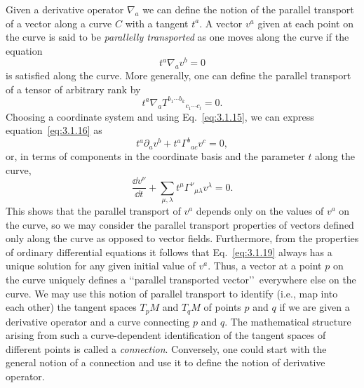 Given a derivative operator $\nabla_a$ we can define the notion of the parallel transport
of a vector along a curve $C$ with a tangent $t^a$. A vector $v^a$ given at each point on the
curve is said to be \emph{parallelly transported} as one moves along the curve if the equation
\begin{equation}
  t^a\nabla_av^b=0
  \tag{3.1.16}\label{eq:3.1.16}
\end{equation}
is satisfied along the curve. More generally, one can define the parallel transport of
a tensor of arbitrary rank by
\begin{equation}
  t^a\nabla_aT^{b_1\cdots b_k}{}_{c_1\cdots c_l}=0.
  \tag{3.1.17}\label{eq:3.1.17}
\end{equation}
Choosing a coordinate system and using Eq.~\eqref{eq:3.1.15}, we can express equation~\eqref{eq:3.1.16} as
\begin{equation}
  t^a\partial_av^b+t^a\Gamma^b{}_{ac}v^c=0,
  \tag{3.1.18}\label{eq:3.1.18}
\end{equation}
or, in terms of components in the coordinate basis and the parameter $t$ along the
curve,
\begin{equation}
  \frac{\dd v^\nu}{\dd t}+\sum_{\mu,\lambda}t^\mu\Gamma^\nu{}_{\mu\lambda}v^\lambda=0.
  \tag{3.1.19}\label{eq:3.1.19}
\end{equation}
This shows that the parallel transport of $v^a$ depends only on the values of $v^a$ on the
curve, so we may consider the parallel transport properties of vectors defined only
along the curve as opposed to vector fields. Furthermore, from the properties of
ordinary differential equations it follows that Eq.~\eqref{eq:3.1.19} always has a unique
solution for any given initial value of $v^a$. Thus, a vector at a point $p$ on the curve
uniquely defines a \lq\lq parallel transported vector\rq\rq\ everywhere else on the curve. We
may use this notion of parallel transport to identify (i.e., map into each other) the
tangent spaces $T_pM$ and $T_qM$ of points $p$ and $q$ if we are given a derivative operator and
a curve connecting $p$ and $q$. The mathematical structure arising from such a curve-dependent identification of the tangent spaces of different points is called a \emph{connection}. Conversely, one could start with the general notion of a connection and use
it to define the notion of derivative operator.

